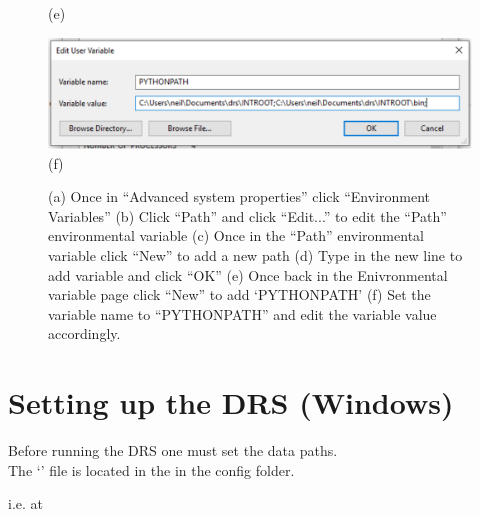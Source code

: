 \begin{figure}
\begin{center}
\begin{minipage}[t]{.29\textwidth}
\begin{center}
(e)
\end{center}
\end{minipage}
\begin{minipage}[t]{.29\textwidth}
\begin{center}
\includegraphics[width=\textwidth]{Figures/win/Win6.pdf}
(f)
\end{center}
\end{minipage}
\end{center}
\caption{(a) Once in ``Advanced system properties'' click ``Environment Variables'' (b) Click ``Path'' and click ``Edit...'' to edit the ``Path'' environmental variable (c) Once in the ``Path'' environmental variable click ``New'' to add a new path (d) Type in the new line to add variable and click ``OK'' (e) Once back in the Enivronmental variable page click ``New'' to add `PYTHONPATH' (f) Set the variable name to ``PYTHONPATH'' and edit the variable value accordingly. \label{figure:screengrabs} }
\end{figure}
\vspace{0.25cm}



\clearpage
\newpage
\section{Setting up the DRS (Windows)}
\label{ch:install:setup_win}

Before running the DRS one must set the data paths. \\

\noindent The `\configtxtfile' file is located in the \InstallDIR in the config folder.

i.e. at \InstallDIR{} \\

